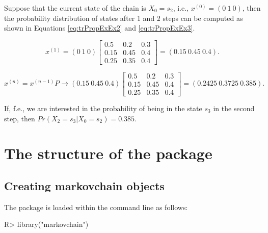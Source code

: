 \documentclass[article,nojss]{jss}
\begin{document}
Suppose that the current state of the chain is \(X_{0}=s_{2}\), i.e., \(x^{(0)}=(0\:1\:0)\), then the probability distribution of states after 1 and 2 steps can be computed as shown in Equations \eqref{eq:trPropExEx2} and \eqref{eq:trPropExEx3}.

\begin{equation}
x^{(1)}=\left(0\:1\:0\right)\left[\begin{array}{ccc}
0.5 & 0.2 & 0.3\\
0.15 & 0.45 & 0.4\\
0.25 & 0.35 & 0.4
\end{array}\right]=\left(0.15\:0.45\:0.4\right).
\label{eq:trPropExEx2}
\end{equation}

\begin{equation}
x^{(n)}=x^{(n-1)}P \to \left(0.15\:0.45\:0.4\right)\left[\begin{array}{ccc}
0.5 & 0.2 & 0.3\\
0.15 & 0.45 & 0.4\\
0.25 & 0.35 & 0.4
\end{array}\right]=\left(0.2425\:0.3725\:0.385\right).
\label{eq:trPropExEx3}
\end{equation}

If, f.e., we are interested in the probability of being in the state \(s_{3}\)
in the second step, then \(Pr\left(X_{2}=s_{3}\left|X_{0}=s_{2}\right.\right)=0.385\).

\newpage

\hypertarget{sec:structure}{%
\section{The structure of the package}\label{sec:structure}}

\hypertarget{creating-markovchain-objects}{%
\subsection{Creating markovchain objects}\label{creating-markovchain-objects}}

The package is loaded within the  command line as follows:

\begin{CodeChunk}

\begin{CodeInput}
R> library("markovchain")
\end{CodeInput}
\end{CodeChunk}
\end{document}
